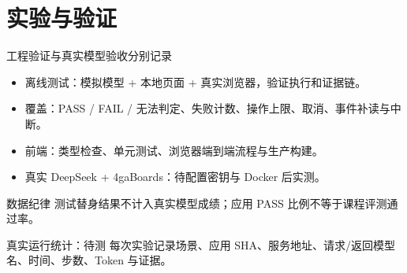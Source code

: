 \section{实验与验证}
\begin{frame}{工程验证与真实模型验收分别记录}
\begin{itemize}
\item 离线测试：模拟模型 + 本地页面 + 真实浏览器，验证执行和证据链。
\item 覆盖：PASS / FAIL / 无法判定、失败计数、操作上限、取消、事件补读与中断。
\item 前端：类型检查、单元测试、浏览器端到端流程与生产构建。
\item 真实 DeepSeek + 4gaBoards：\alert{待配置密钥与 Docker 后实测}。
\end{itemize}
\begin{block}{数据纪律}
测试替身结果不计入真实模型成绩；应用 PASS 比例不等于课程评测通过率。
\end{block}
\end{frame}
\begin{frame}{真实运行统计：待测}
\vfill
\small 每次实验记录场景、应用 SHA、服务地址、请求/返回模型名、时间、步数、Token 与证据。
\end{frame}
